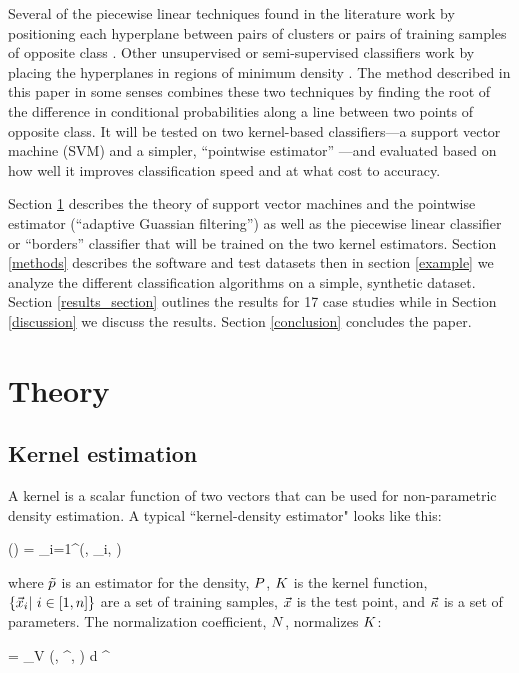 Several of the piecewise linear techniques found in the literature work by
positioning each hyperplane between pairs of clusters or pairs of training
samples of opposite class 
\citep{Sklansky_Michelotti1980,Tenmoto_etal1998,Kostin2006,Gai_Zhang2010}.
Other unsupervised or semi-supervised classifiers work by placing the 
hyperplanes in regions of minimum density \citep{Pavlidis_etal2016}.
The method described in this paper in some senses combines these two techniques
by finding the root of the difference in conditional probabilities along a
line between two points of opposite class.
It will be tested on two kernel-based classifiers---a support vector
machine (SVM) \citep{Michie_etal1994,Mueller_etal2001}
and a simpler, ``pointwise estimator'' \citep{Terrell_Scott1992,Mills2011}---and evaluated based on how
well it improves classification speed and at what cost to accuracy.

Section \ref{theory} describes the theory of support
vector machines and the pointwise estimator (``adaptive Guassian filtering'')
as well as the piecewise linear classifier or ``borders'' classifier
that will be trained on the two kernel estimators.
Section \ref{methods} describes the software and test datasets then in
section \ref{example} we analyze the different classification algorithms on
a simple, synthetic dataset.
Section \ref{results_section} outlines the results for 17 case studies
while in Section \ref{discussion} we discuss the results.
Section \ref{conclusion} concludes the paper.

\section{Theory}

\label{theory}

\subsection{Kernel estimation}

A kernel is a scalar function of two vectors that can be used for 
non-parametric density estimation. A typical ``kernel-density estimator"
looks like this:
\begin{eqnnon}
	\densityestimator(\testpoint) =  \sum_{i=1}^\nsample \vectorkernel(\testpoint, \sample_i, )
	\label{kernel_estimator}
\end{eqnnon}
where $\tilde p$ is an estimator for the density, $P$, 
$K$ is the kernel function,
$\lbrace \vec {x}_i | ~ i \in [1,n] \rbrace$ are a set of training samples, 
$\vec {x}$ is the test point,
and $\vec \kappa$ is a set of parameters. 
The normalization coefficient, $N$, normalizes $K$:
\begin{eqnnon}
	\norm = \int_V \vectorkernel(\point, \point^\prime, ) \mathrm d \point^\prime
	\label{norm_def}
\end{eqnnon}

